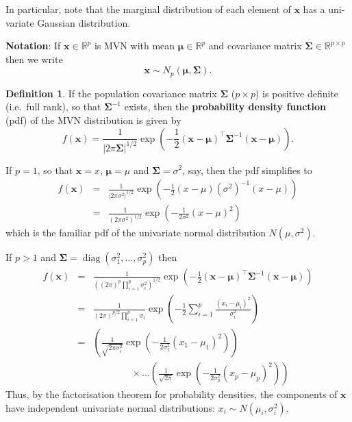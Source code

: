 \documentclass[]{book}
\theoremstyle{definition}
\newtheorem{definition}{Definition}[chapter]
\theoremstyle{definition}
\theoremstyle{definition}
\theoremstyle{remark}
\begin{document}
In particular, note that the marginal distribution of each element of \(\mathbf x\) has a uni-variate Gaussian distribution.

\textbf{Notation}: \quad If \(\mathbf x\in \mathbb{R}^p\) is MVN with mean \({\boldsymbol{\mu}}\in \mathbb{R}^p\) and covariance matrix \(\boldsymbol{\Sigma}\in \mathbb{R}^{p\times p}\) then we write
\[ \mathbf x\sim N_p ({\boldsymbol{\mu}}, \boldsymbol{\Sigma}).\]

\begin{definition}
\protect\hypertarget{def:mvnpdf}{}{\label{def:mvnpdf} }If the population covariance matrix \(\boldsymbol{\Sigma}\) (\(p \times p\)) is positive definite (i.e.~full rank), so that \(\boldsymbol{\Sigma}^{-1}\) exists,
then the \textbf{probability density function} (pdf) of the MVN distribution is given by
\[ f(\mathbf x) = \frac{1}{| 2 \pi \boldsymbol{\Sigma}|^{1/2}} \exp \left(-\frac{1}{2}(\mathbf x- {\boldsymbol{\mu}})^\top \boldsymbol{\Sigma}^{-1} (\mathbf x- {\boldsymbol{\mu}}) \right).\]
\end{definition}

If \(p=1\), so that \(\mathbf x= x\), \({\boldsymbol{\mu}}= \mu\) and \(\boldsymbol{\Sigma}= \sigma^2\), say, then the pdf simplifies to
\begin{eqnarray*}
f(\mathbf x) &=& \frac{1}{|2 \pi \sigma^2|^{1/2}} \exp \left(-\frac{1}{2}(x - \mu) (\sigma^2)^{-1} (x - \mu) \right)\\
&=& \frac{1}{(2 \pi \sigma^2)^{1/2}} \exp \left(-\frac{1}{2 \sigma^2}(x - \mu)^2 \right)
\end{eqnarray*}
which is the familiar pdf of the univariate normal distribution \(N(\mu,\sigma^2)\).

If \(p>1\) and \(\boldsymbol{\Sigma}= \operatorname{diag}(\sigma_1^2, \ldots, \sigma_p^2)\) then
\begin{eqnarray*}
f(\mathbf x) &=& \frac{1}{((2 \pi)^{p}\prod_{i=1}^p \sigma_i^2)^{1/2}} \exp \left(-\frac{1}{2}(\mathbf x- {\boldsymbol{\mu}})^\top \boldsymbol{\Sigma}^{-1}(\mathbf x- {\boldsymbol{\mu}}) \right)\\
&=& \frac{1}{(2 \pi)^{p/2}\prod_{i=1}^p \sigma_i} \exp \left(-\frac{1}{2} \sum_{i=1}^p \frac{(x_i - \mu_i)^2}{\sigma_i^2} \right)\\
&=& \left(\frac{1}{\sqrt{2 \pi\sigma_i^2}} \exp \left(-\frac{1}{2\sigma_1^2} (x_1 - \mu_1)^2 \right)\right)\\
 && \qquad \qquad \times \ldots \left(\frac{1}{\sqrt{2 \pi}} \exp \left(-\frac{1}{2\sigma_p^2} (x_p - \mu_p)^2 \right)\right)
\end{eqnarray*}
Thus, by the factorisation theorem for probability densities, the components of \(\mathbf x\) have independent univariate normal distributions: \(x_i \sim N(\mu_i, \sigma_i^2)\).
\end{document}
